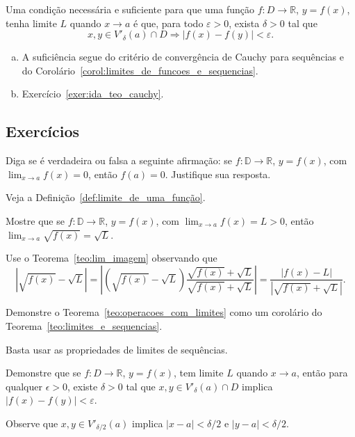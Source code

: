 \begin{teo}
  Uma condição necessária e suficiente para que uma função $f:D\to\mathbb{R}$, $y=f(x)$, tenha limite $L$ quando $x\to a$ é que, para todo $\varepsilon>0$, exista $\delta>0$ tal que
  \begin{equation}
    x,y\in V'_\delta(a)\cap D \Rightarrow |f(x)-f(y)|<\varepsilon.
  \end{equation}
\end{teo}
\begin{dem}
  \begin{enumerate}[a)]
  \item A suficiência segue do critério de convergência de Cauchy para sequências e do Corolário~\ref{corol:limites_de_funcoes_e_sequencias}.
  \item Exercício~\ref{exer:ida_teo_cauchy}.
  \end{enumerate}
\end{dem}

\subsection*{Exercícios}

\begin{exer}
  Diga se é verdadeira ou falsa a seguinte afirmação: se $f:\mathbb{D}\to\mathbb{R}$, $y=f(x)$, com $\lim_{x\to a}f(x)=0$, então $f(a)=0$. Justifique sua resposta.
\end{exer}
\begin{resp}
  Veja a Definição~\ref{def:limite_de_uma_função}.
\end{resp}

\begin{exer}
  Mostre que se $f:\mathbb{D}\to\mathbb{R}$, $y=f(x)$, com $\lim_{x\to a}f(x)=L>0$, então $\lim_{x\to a}\sqrt{f(x)}=\sqrt{L}$.
\end{exer}
\begin{resp}
  Use o Teorema~\ref{teo:lim_imagem} observando que
  \begin{equation}
    |\sqrt{f(x)}-\sqrt{L}| = |(\sqrt{f(x)}-\sqrt{L})\frac{\sqrt{f(x)}+\sqrt{L}}{\sqrt{f(x)}+\sqrt{L}}| = \frac{|f(x) - L|}{|\sqrt{f(x)}+\sqrt{L}|}.
  \end{equation}
\end{resp}

\begin{exer}
  Demonstre o Teorema~\ref{teo:operacoes_com_limites} como um corolário do Teorema~\ref{teo:limites_e_sequencias}.
\end{exer}
\begin{resp}
  Basta usar as propriedades de limites de sequências.
\end{resp}

\begin{exer}\label{exer:ida_teo_cauchy}
  Demonstre que se $f:D\to\mathbb{R}$, $y=f(x)$, tem limite $L$ quando $x\to a$, então para qualquer $\epsilon>0$, existe $\delta>0$ tal que $x,y\in V'_\delta(a)\cap D$ implica $|f(x)-f(y)|<\varepsilon$.
\end{exer}
\begin{resp}
  Observe que $x,y\in V'_{\delta/2}(a)$ implica $|x-a|<\delta/2$ e $|y-a|<\delta/2$.
\end{resp}